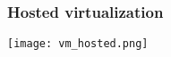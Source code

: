 \begin{frame}
\frametitle{Hosted virtualization}
    \center\texttt{[image: vm\_hosted.png]}
\end{frame}


